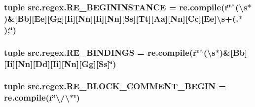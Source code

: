 \hypertarget{namespacesrc_1_1regex_a274be3799ea3a9e86322f3a13b8d50b7}{
\subsubsection[{R\-E\-\_\-\-B\-E\-G\-I\-N\-I\-N\-S\-T\-A\-N\-C\-E}]{\setlength{\rightskip}{0pt plus 5cm}tuple src.\-regex.\-R\-E\-\_\-\-B\-E\-G\-I\-N\-I\-N\-S\-T\-A\-N\-C\-E = re.\-compile(r\char`\"{}$^\wedge$(\textbackslash{}s$\ast$)\&\mbox{[}Bb\mbox{]}\mbox{[}Ee\mbox{]}\mbox{[}Gg\mbox{]}\mbox{[}Ii\mbox{]}\mbox{[}Nn\mbox{]}\mbox{[}Ii\mbox{]}\mbox{[}Nn\mbox{]}\mbox{[}Ss\mbox{]}\mbox{[}Tt\mbox{]}\mbox{[}Aa\mbox{]}\mbox{[}Nn\mbox{]}\mbox{[}Cc\mbox{]}\mbox{[}Ee\mbox{]}\textbackslash{}s+(.$\ast$);\char`\"{})}}\label{namespacesrc_1_1regex_a274be3799ea3a9e86322f3a13b8d50b7}
\hypertarget{namespacesrc_1_1regex_a5b2e471e40b31b12aea129c024ddaed1}{
\subsubsection[{R\-E\-\_\-\-B\-I\-N\-D\-I\-N\-G\-S}]{\setlength{\rightskip}{0pt plus 5cm}tuple src.\-regex.\-R\-E\-\_\-\-B\-I\-N\-D\-I\-N\-G\-S = re.\-compile(r\char`\"{}$^\wedge$(\textbackslash{}s$\ast$)\&\mbox{[}Bb\mbox{]}\mbox{[}Ii\mbox{]}\mbox{[}Nn\mbox{]}\mbox{[}Dd\mbox{]}\mbox{[}Ii\mbox{]}\mbox{[}Nn\mbox{]}\mbox{[}Gg\mbox{]}\mbox{[}Ss\mbox{]}\char`\"{})}}\label{namespacesrc_1_1regex_a5b2e471e40b31b12aea129c024ddaed1}
\hypertarget{namespacesrc_1_1regex_a4178334cd19fdaf15bee28a9d4982f78}{
\subsubsection[{R\-E\-\_\-\-B\-L\-O\-C\-K\-\_\-\-C\-O\-M\-M\-E\-N\-T\-\_\-\-B\-E\-G\-I\-N}]{\setlength{\rightskip}{0pt plus 5cm}tuple src.\-regex.\-R\-E\-\_\-\-B\-L\-O\-C\-K\-\_\-\-C\-O\-M\-M\-E\-N\-T\-\_\-\-B\-E\-G\-I\-N = re.\-compile(r\char`\"{}\textbackslash{}/\textbackslash{}$\ast$\char`\"{})}}\label{namespacesrc_1_1regex_a4178334cd19fdaf15bee28a9d4982f78}
